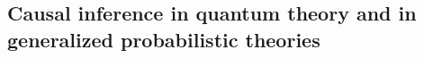 {%








\color{black}


\subsection{Causal inference in quantum theory and in generalized probabilistic theories\label{sec:classicallity}}


}
